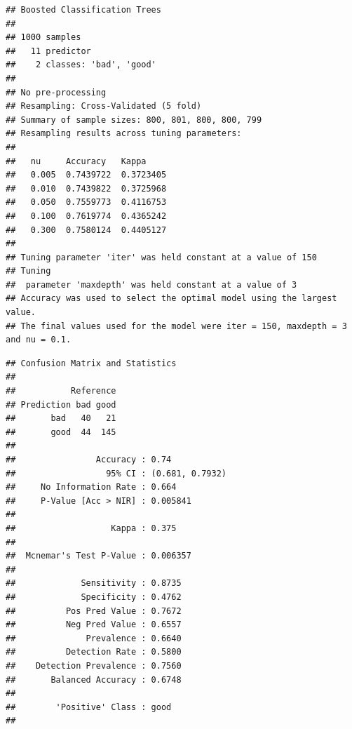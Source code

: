 \documentclass[
  spanish,
]{book}
\newenvironment{Shaded}{\begin{snugshade}}{\end{snugshade}}
\newcommand{\AttributeTok}[1]{\textcolor[rgb]{0.77,0.63,0.00}{#1}}
\newcommand{\FunctionTok}[1]{\textcolor[rgb]{0.00,0.00,0.00}{#1}}
\newcommand{\NormalTok}[1]{#1}
\newcommand{\SpecialCharTok}[1]{\textcolor[rgb]{0.00,0.00,0.00}{#1}}
\newcommand{\StringTok}[1]{\textcolor[rgb]{0.31,0.60,0.02}{#1}}
\theoremstyle{break}
\theoremstyle{definition}
\theoremstyle{definition}
\theoremstyle{definition}
\theoremstyle{definition}
\theoremstyle{remark}
\begin{document}
\begin{verbatim}
## Boosted Classification Trees 
## 
## 1000 samples
##   11 predictor
##    2 classes: 'bad', 'good' 
## 
## No pre-processing
## Resampling: Cross-Validated (5 fold) 
## Summary of sample sizes: 800, 801, 800, 800, 799 
## Resampling results across tuning parameters:
## 
##   nu     Accuracy   Kappa    
##   0.005  0.7439722  0.3723405
##   0.010  0.7439822  0.3725968
##   0.050  0.7559773  0.4116753
##   0.100  0.7619774  0.4365242
##   0.300  0.7580124  0.4405127
## 
## Tuning parameter 'iter' was held constant at a value of 150
## Tuning
##  parameter 'maxdepth' was held constant at a value of 3
## Accuracy was used to select the optimal model using the largest value.
## The final values used for the model were iter = 150, maxdepth = 3 and nu = 0.1.
\end{verbatim}

\begin{Shaded}
\end{Shaded}

\begin{verbatim}
## Confusion Matrix and Statistics
## 
##           Reference
## Prediction bad good
##       bad   40   21
##       good  44  145
##                                          
##                Accuracy : 0.74           
##                  95% CI : (0.681, 0.7932)
##     No Information Rate : 0.664          
##     P-Value [Acc > NIR] : 0.005841       
##                                          
##                   Kappa : 0.375          
##                                          
##  Mcnemar's Test P-Value : 0.006357       
##                                          
##             Sensitivity : 0.8735         
##             Specificity : 0.4762         
##          Pos Pred Value : 0.7672         
##          Neg Pred Value : 0.6557         
##              Prevalence : 0.6640         
##          Detection Rate : 0.5800         
##    Detection Prevalence : 0.7560         
##       Balanced Accuracy : 0.6748         
##                                          
##        'Positive' Class : good           
## 
\end{verbatim}
\end{document}
